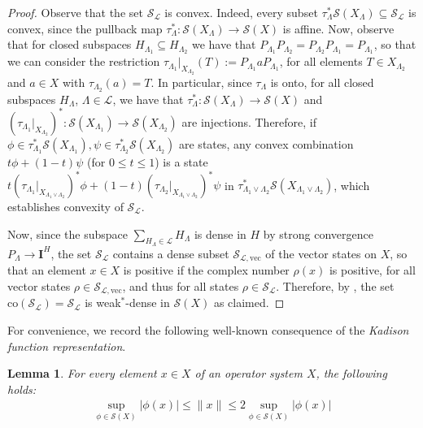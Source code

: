 \documentclass{amsart}
\theoremstyle{plain}
\newtheorem{lemma}[theorem]{Lemma}
\theoremstyle{definition}
\theoremstyle{remark}
\def\black{\color{black}}
\begin{document}
	\begin{proof}
		Observe that the set $\mathcal{S}_\mathcal{L}$ is convex.
		Indeed, every subset $\tau_\Lambda^* \mathcal{S}(X_\Lambda) \subseteq \mathcal{S}_\mathcal{L}$ is convex, since the pullback map $\tau_\Lambda^* : \mathcal{S}(X_\Lambda) \rightarrow \mathcal{S}(X)$ is affine.
		Now, observe that for closed subspaces $H_{\Lambda_1} \subseteq H_{\Lambda_2}$ we have that $P_{\Lambda_1} P_{\Lambda_2} = P_{\Lambda_2} P_{\Lambda_1} = P_{\Lambda_1}$, so that we can consider the restriction $\tau_{\Lambda_1}\big|_{X_{\Lambda_2}} (T) := P_{\Lambda_1} a P_{\Lambda_1}$, for all elements $T \in X_{\Lambda_2}$ and $a \in X$ with $\tau_{\Lambda_2}(a) = T$.
		In particular, since $\tau_\Lambda$ is onto, for all closed subspaces $H_\Lambda$, $\Lambda \in \mathcal{L}$, we have that $\tau_\Lambda^* : \mathcal{S}(X_\Lambda) \rightarrow \mathcal{S}(X)$ and $(\tau_{\Lambda_1}\big|_{X_{\Lambda_2}})^* : \mathcal{S}(X_{\Lambda_1}) \rightarrow \mathcal{S}(X_{\Lambda_2})$ are injections.
		Therefore, if $\phi \in \tau_{\Lambda_1}^*\mathcal{S}(X_{\Lambda_1}), \psi \in \tau_{\Lambda_2}^*\mathcal{S}(X_{\Lambda_2})$ are states, any convex combination $t\phi + (1-t)\psi$ (for $0 \leq t \leq 1$) is a state $t (\tau_{\Lambda_1}\big|_{X_{\Lambda_1 \vee \Lambda_2}})^* \phi + (1-t) (\tau_{\Lambda_2}\big|_{X_{\Lambda_1 \vee \Lambda_2}})^* \psi$ in $\tau_{\Lambda_1 \vee \Lambda_2}^*\mathcal{S}(X_{\Lambda_1 \vee \Lambda_2})$, which establishes convexity of $\mathcal{S}_\mathcal{L}$.
		
		Now, since the subspace $\sum_{H_\Lambda \in \mathcal{L}} H_\Lambda$ is dense in $H$ by strong convergence $P_\Lambda \rightarrow \mathbf{I}^H$, the set $\mathcal{S}_\mathcal{L}$ contains a dense subset $\mathcal{S}_{\mathcal{L},\mathrm{vec}}$ of the vector states on $X$, so that an element $x \in X$ is positive if the complex number $\rho(x)$ is positive, for all vector states $\rho \in \mathcal{S}_{\mathcal{L},\mathrm{vec}}$, and thus for all states $\rho \in \mathcal{S}_\mathcal{L}$.
		Therefore, by \cite[Theorem 4.3.9]{KR1}, the set $\mathrm{co}(\mathcal{S}_\mathcal{L}) = \mathcal{S}_\mathcal{L}$ is weak$^*$-dense in $\mathcal{S}(X)$ as claimed.
	\end{proof}
	\black
	
	For convenience, we record the following well-known consequence of the \emph{Kadison function representation}.
	
	\begin{lemma}\label{lem:Kadison-function-representation}
		For every element $x \in X$ of an operator system $X$, the following holds:
		\begin{align}
			\sup_{\phi \in \mathcal{S}(X)} |\phi(x)| 
			\leq \lVert x\rVert
			\leq 2 \sup_{\phi \in \mathcal{S}(X)} |\phi(x)|
		\end{align}
	\end{lemma}
	
\end{document}
